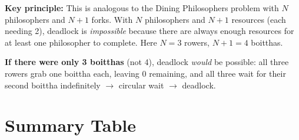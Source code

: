 \documentclass[11pt,a4paper]{article}
\begin{document}
\begin{answerbox}
\textbf{Key principle:} This is analogous to the Dining Philosophers problem with $N$ philosophers and $N+1$ forks. With $N$ philosophers and $N+1$ resources (each needing 2), deadlock is \emph{impossible} because there are always enough resources for at least one philosopher to complete. Here $N = 3$ rowers, $N+1 = 4$ boitthas.

\textbf{If there were only 3 boitthas} (not 4), deadlock \emph{would} be possible: all three rowers grab one boittha each, leaving 0 remaining, and all three wait for their second boittha indefinitely $\to$ circular wait $\to$ deadlock.
\end{answerbox}

\section{Summary Table}
\end{document}
